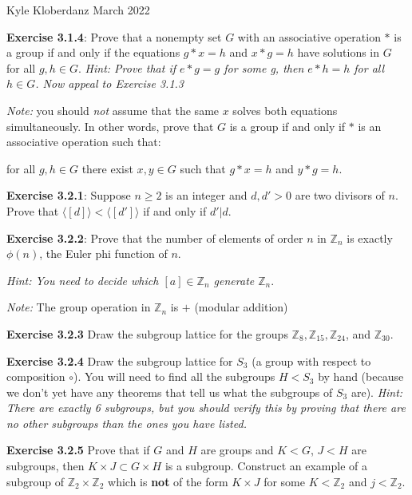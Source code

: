 \documentclass[a4paper]{article}
\begin{document}
\begin{myparindent}{0pt}

Kyle Kloberdanz  March 2022 \newline

\textbf{Exercise 3.1.4}:
Prove that a nonempty set $G$ with an associative operation $*$ is a group if
and only if the equations $g * x = h$ and $x * g = h$ have solutions in $G$
for all $g, h \in G$. \textit{Hint: Prove that if $e * g = g$ for some g, then
$e * h = h$ for all $h \in G$. Now appeal to Exercise 3.1.3} \newline

\textit{Note:} you should \textit{not} assume that the same $x$ solves both
equations simultaneously. In other words, prove that $G$ is a group if and only
if $*$ is an associative operation such that: \newline

for all $g, h \in G$ there exist $x, y \in G$ such that $g * x = h$ and $y * g = h$.
\newline

\textbf{Exercise 3.2.1}:
Suppose $n \ge 2$ is an integer and $d, d' > 0$ are two divisors of $n$. Prove
that $\langle [d] \rangle < \langle [d'] \rangle$ if and only if $d'|d$.
\newline

\textbf{Exercise 3.2.2}:
Prove that the number of elements of order $n$ in $\mathbb{Z}_n$ is exactly
$\phi(n)$, the Euler phi function of $n$.

\textit{Hint: You need to decide which $[a] \in \mathbb{Z}_n$ generate $\mathbb{Z}_n$}.
\newline

\textit{Note:} The group operation in $\mathbb{Z}_n$ is $+$ (modular addition)
\newline

\textbf{Exercise 3.2.3}
Draw the subgroup lattice for the groups
$\mathbb{Z}_8, \mathbb{Z}_{15}, \mathbb{Z}_{24}$, and $\mathbb{Z}_{30}$.
\newline

\textbf{Exercise 3.2.4}
Draw the subgroup lattice for $S_3$ (a group with respect to composition $\circ$).
You will need to find all the subgroups $H < S_3$ by hand (because we don't yet
have any theorems that tell us what the subgroups of $S_3$ are).
\textit{Hint: There are exactly 6 subgroups, but you should verify this by proving
that there are no other subgroups than the ones you have listed.}
\newline

\textbf{Exercise 3.2.5}
Prove that if $G$ and $H$ are groups and $K < G$, $J < H$ are subgroups, then
$K \times J \subset G \times H$ is a subgroup. Construct an example of a
subgroup of $\mathbb{Z}_2 \times \mathbb{Z}_2$ which is \textbf{not} of the form
$K \times J$ for some $K < \mathbb{Z}_2$ and $j < \mathbb{Z}_2$.

\end{myparindent}
\end{document}

